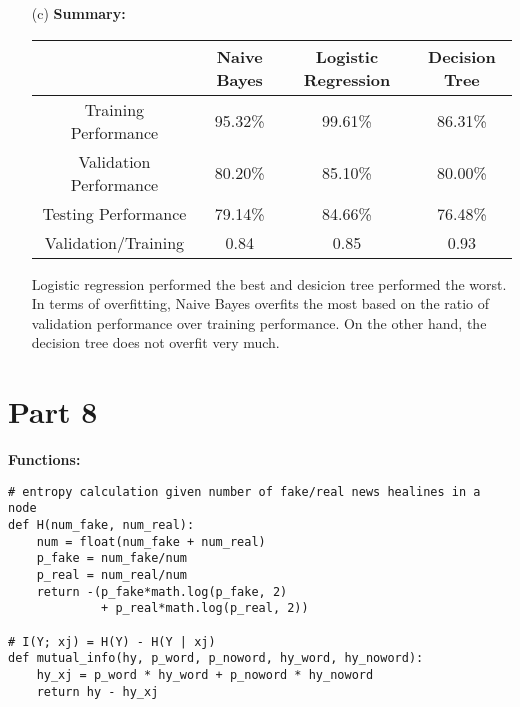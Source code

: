 \documentclass{article}
\begin{document}
\begin{enumerate}
\item[(c)]
\textbf{Summary:}\\

\begin{tabular}{ |c|c|c|c| } 
\hline
&Naive Bayes & Logistic Regression & Decision Tree \\
\hline
Training Performance  & 95.32\% & 99.61\% & 86.31\% \\ 
Validation Performance & 80.20\% & 85.10\% & 80.00\% \\ 
Testing Performance & 79.14\% & 84.66\% & 76.48\% \\ 
Validation/Training & 0.84 & 0.85 &0.93\\
\hline
\end{tabular}

Logistic regression performed the best and desicion tree performed the worst. In terms of overfitting, Naive Bayes overfits the most based on the ratio of validation performance over training performance. On the other hand, the decision tree does not overfit very much.

\end{enumerate}

\section*{Part 8}
\textbf{Functions:}
\begin{verbatim}
# entropy calculation given number of fake/real news healines in a node
def H(num_fake, num_real):
    num = float(num_fake + num_real)
    p_fake = num_fake/num
    p_real = num_real/num
    return -(p_fake*math.log(p_fake, 2) 
             + p_real*math.log(p_real, 2))
    
# I(Y; xj) = H(Y) - H(Y | xj) 
def mutual_info(hy, p_word, p_noword, hy_word, hy_noword):
    hy_xj = p_word * hy_word + p_noword * hy_noword
    return hy - hy_xj
\end{verbatim}
\end{document}
